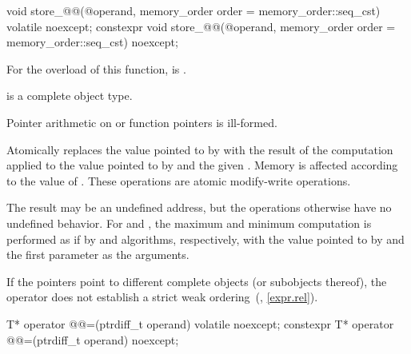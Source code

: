 %
%
%
%
%
%
%
%
%
%
%
%
\begin{itemdecl}
void store_@@(@\seeabovenc@ operand, memory_order order = memory_order::seq_cst) volatile noexcept;
constexpr void store_@@(@\seeabovenc@ operand, memory_order order = memory_order::seq_cst) noexcept;
\end{itemdecl}

\begin{itemdescr}
\pnum
\constraints
For the  overload of this function,
 is .

\pnum
\mandates
{} is a complete object type.
\begin{note}
Pointer arithmetic on  or function pointers is ill-formed.
\end{note}

\pnum
\effects
Atomically replaces the value pointed to by 
with the result of the computation applied to
the value pointed to by  and the given .
Memory is affected according to the value of .
These operations are atomic modify-write operations.

\pnum
\remarks
The result may be an undefined address,
but the operations otherwise have no undefined behavior.
For  and ,
the maximum and minimum computation is performed
as if by  and  algorithms, respectively,
with the value pointed to by  and
the first parameter as the arguments.
\begin{note}
If the pointers point to different complete objects (or subobjects thereof),
the \tcode{<} operator does not establish
a strict weak ordering~(, \ref{expr.rel}).
\end{note}
\end{itemdescr}

%
%
\begin{itemdecl}
T* operator @@=(ptrdiff_t operand) volatile noexcept;
constexpr T* operator @@=(ptrdiff_t operand) noexcept;
\end{itemdecl}

